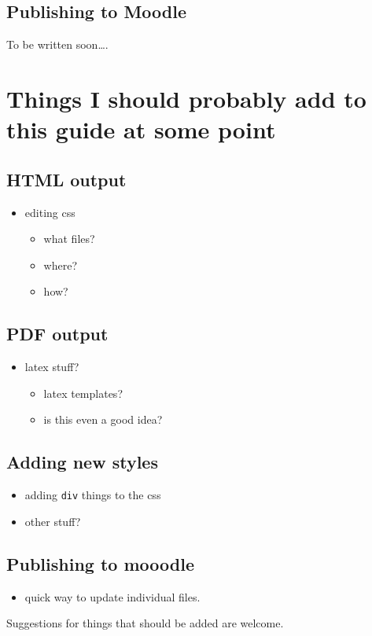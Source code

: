 \documentclass[
]{book}
\providecommand{\tightlist}{%
  \setlength{\itemsep}{0pt}\setlength{\parskip}{0pt}}
\begin{document}
\section{Publishing to Moodle}\label{sec:moodle-pub}

To be written soon\ldots.

\chapter*{Things I should probably add to this guide at some point}\label{sec:todo}

\section*{HTML output}\label{html-output}

\begin{itemize}
\tightlist
\item
  editing css

  \begin{itemize}
  \tightlist
  \item
    what files?
  \item
    where?
  \item
    how?
  \end{itemize}
\end{itemize}

\section*{PDF output}\label{pdf-output}

\begin{itemize}
\tightlist
\item
  latex stuff?

  \begin{itemize}
  \tightlist
  \item
    latex templates?
  \item
    is this even a good idea?
  \end{itemize}
\end{itemize}

\section*{Adding new styles}\label{adding-new-styles}

\begin{itemize}
\tightlist
\item
  adding \texttt{div} things to the css
\item
  other stuff?
\end{itemize}

\section*{Publishing to mooodle}\label{publishing-to-mooodle}

\begin{itemize}
\tightlist
\item
  quick way to update individual files.
\end{itemize}

Suggestions for things that should be added are welcome.

  
\end{document}
